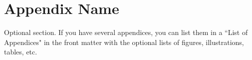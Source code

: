 \documentclass[12pt]{report}
\begin{document}
\appendix

\chapter*{Appendix Name}\label{app:name}
Optional section. If you have several appendices, you can list them in a ``List of Appendices" in the front matter with the optional lists of figures, illustrations, tables, etc.

\singlespacing
\printbibliography[heading=bibintoc, title={Bibliography}]
\end{document}
